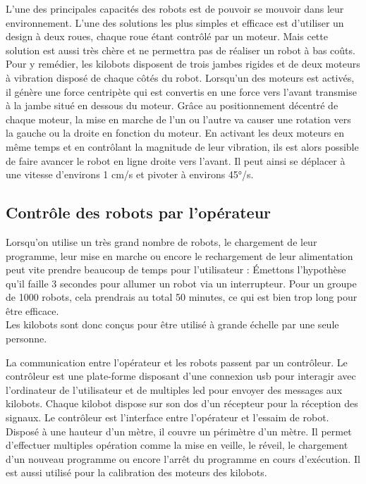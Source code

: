 \documentclass[a4paper,8pt]{report}
\begin{document}
L'une des principales capacit\'es des robots est de pouvoir se mouvoir dans leur environnement. L'une des solutions les plus simples et efficace est d'utiliser un design \`a deux roues, chaque roue \'etant contr\^ol\'e par un moteur. Mais cette solution est aussi tr\`es ch\`ere et ne permettra pas de r\'ealiser un robot \`a bas co\^uts. \\
Pour y rem\'edier, les kilobots disposent de trois jambes rigides et de deux moteurs \`a vibration dispos\'e de chaque c\^ot\'es du robot. Lorsqu'un des moteurs est activ\'es, il g\'en\`ere une force centrip\`ete qui est convertis en une force vers l'avant transmise \`a la jambe situ\'e en dessous du moteur. Gr\^ace au positionnement d\'ecentr\'e de chaque moteur, la mise en marche de l'un ou l'autre va causer une rotation vers la gauche ou la droite en fonction du moteur. En activant les deux moteurs en m\^eme temps et en contr\^olant la magnitude de leur vibration, ils est alors possible de faire avancer le robot en ligne droite vers l'avant. Il peut ainsi se d\'eplacer \`a une vitesse d'environs 1 cm/s et pivoter \`a environs 45°/s.

\subsection*{Contr\^ole des robots par l'op\'erateur}\label{subsec:name}

Lorsqu'on utilise un tr\`es grand nombre de robots, le chargement de leur programme, leur mise en marche ou encore le rechargement de leur alimentation peut vite prendre beaucoup de temps pour l'utilisateur : \'Emettons l'hypoth\`ese qu'il faille 3 secondes pour allumer un robot via un interrupteur. Pour un groupe de 1000 robots, cela prendrais au total 50 minutes, ce qui est bien trop long pour \^etre efficace. \\
Les kilobots sont donc conçus pour \^etre utilis\'e \`a grande \'echelle par une seule personne. 

\smallskip
La communication entre l'op\'erateur et les robots passent par un contr\^oleur. Le contr\^oleur est une plate-forme disposant d'une connexion usb pour interagir avec l'ordinateur de l'utilisateur et de multiples led pour envoyer des messages aux kilobots. Chaque kilobot dispose sur son dos d'un r\'ecepteur pour la r\'eception des signaux. Le contr\^oleur est l'interface entre l'op\'erateur et l'essaim de robot. Dispos\'e \`a une hauteur d'un m\`etre, il couvre un p\'erim\`etre d'un m\`etre. Il permet d'effectuer multiples op\'eration comme la mise en veille, le r\'eveil, le chargement d'un nouveau programme ou encore l'arr\^et du programme en cours d'ex\'ecution. Il est aussi utilis\'e pour la calibration des moteurs des kilobots.
\end{document}

